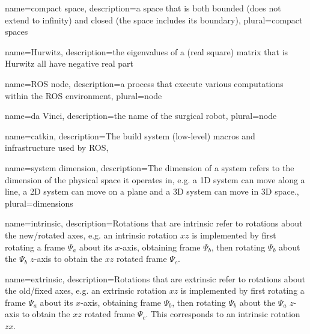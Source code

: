 {name={compact space},
 description={a space that is both bounded (does not extend to infinity) and closed (the space includes its boundary)},
 plural={compact spaces}
}

{name={Hurwitz},
 description={the eigenvalues of a (real square) matrix that is Hurwitz all have negative real part}
}

{name=ROS node,
 description={a process that execute various computations within the ROS environment},
 plural={node}
}


{name=da Vinci,
 description={the name of the surgical robot},
 plural={node}
}

{name=catkin,
 description={The build system (low-level) macros and infrastructure used by ROS},
}


{name={system dimension},
 description={The dimension of a system refers to the dimension of the physical space it operates in, e.g. a 1D system can move along a line, a 2D system can move on a plane and a 3D system can move in 3D space.},
 plural={dimensions}
}


{name={intrinsic},
	description={Rotations that are intrinsic refer to rotations about the new/rotated axes, e.g. an intrinsic rotation $xz$ is implemented by first rotating a frame $\Psi_a$ about its $x$-axis, obtaining frame $\Psi_b$, then rotating $\Psi_b$ about the $\Psi_b$ $z$-axis to obtain the $xz$ rotated frame $\Psi_c$.}
}

{name={extrinsic},
	description={Rotations that are extrinsic refer to rotations about the old/fixed axes, e.g. an extrinsic rotation $xz$ is implemented by first rotating a frame $\Psi_a$ about its $x$-axis, obtaining frame $\Psi_b$, then rotating $\Psi_b$ about the $\Psi_a$ $z$-axis to obtain the $xz$ rotated frame $\Psi_c$. This corresponds to an intrinsic rotation $zx$.}
}


